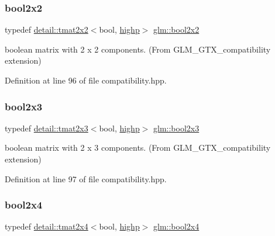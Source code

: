 \subsubsection{\texorpdfstring{bool2x2}{bool2x2}}
{\footnotesize\ttfamily typedef \hyperlink{structglm_1_1detail_1_1tmat2x2}{detail\+::tmat2x2}$<$bool, \hyperlink{namespaceglm_a0f04f086094c747d227af4425893f545ac6f7eab42eacbb10d59a58e95e362074}{highp}$>$ \hyperlink{group__gtx__compatibility_ga44cd09c0dad9ea163f038a342555867f}{glm\+::bool2x2}}



boolean matrix with 2 x 2 components. (From G\+L\+M\+\_\+\+G\+T\+X\+\_\+compatibility extension) 



Definition at line 96 of file compatibility.\+hpp.

\mbox{\label{group__gtx__compatibility_ga75013772bb088d107a1c1a994e7f9b14}} 
\subsubsection{\texorpdfstring{bool2x3}{bool2x3}}
{\footnotesize\ttfamily typedef \hyperlink{structglm_1_1detail_1_1tmat2x3}{detail\+::tmat2x3}$<$bool, \hyperlink{namespaceglm_a0f04f086094c747d227af4425893f545ac6f7eab42eacbb10d59a58e95e362074}{highp}$>$ \hyperlink{group__gtx__compatibility_ga75013772bb088d107a1c1a994e7f9b14}{glm\+::bool2x3}}



boolean matrix with 2 x 3 components. (From G\+L\+M\+\_\+\+G\+T\+X\+\_\+compatibility extension) 



Definition at line 97 of file compatibility.\+hpp.

\mbox{\label{group__gtx__compatibility_gaf24096d8a88d274b94002386a3fcab0c}} 
\subsubsection{\texorpdfstring{bool2x4}{bool2x4}}
{\footnotesize\ttfamily typedef \hyperlink{structglm_1_1detail_1_1tmat2x4}{detail\+::tmat2x4}$<$bool, \hyperlink{namespaceglm_a0f04f086094c747d227af4425893f545ac6f7eab42eacbb10d59a58e95e362074}{highp}$>$ \hyperlink{group__gtx__compatibility_gaf24096d8a88d274b94002386a3fcab0c}{glm\+::bool2x4}}



